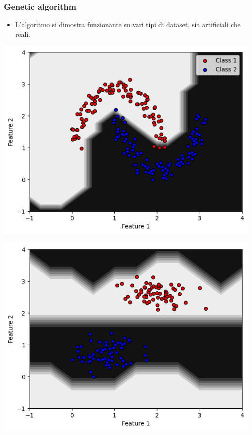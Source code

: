 \documentclass{beamer}
\begin{document}
\begin{frame}
  \frametitle{Genetic algorithm}
  \begin{itemize}
    \item L'algoritmo si dimostra funzionante su vari tipi di dataset, sia artificiali che reali. 
  \end{itemize}
  \vspace{0.8cm}

  \begin{minipage}{0.5\textwidth}
    \centering
    \includegraphics[width=\textwidth]{images/moonsrbf.png}
\end{minipage}%
\begin{minipage}{0.5\textwidth}
    \centering
    \includegraphics[width=\textwidth]{images/qsvm.png}
\end{minipage}
\end{frame}
\end{document}
